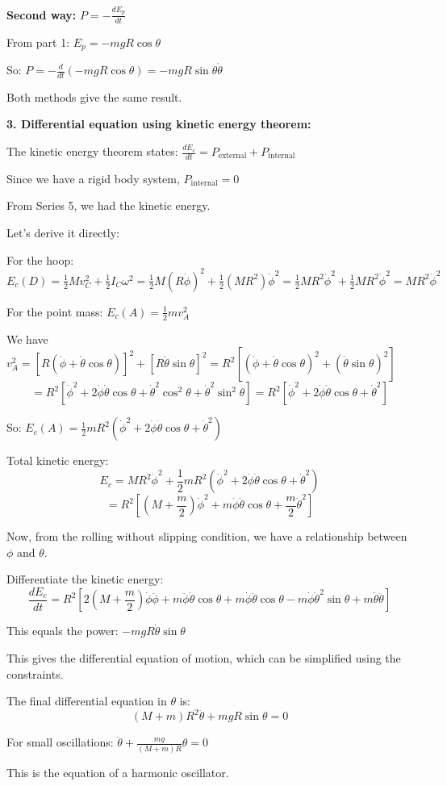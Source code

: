 \documentclass[12pt]{article}
\begin{document}
\begin{correctionbox}
\textbf{Second way:} $P = -\frac{dE_p}{dt}$

From part 1: $E_p = -mgR\cos\theta$

So: $P = -\frac{d}{dt}(-mgR\cos\theta) = -mgR\sin\theta\dot{\theta}$

Both methods give the same result.

\textbf{3. Differential equation using kinetic energy theorem:}

The kinetic energy theorem states: $\frac{dE_c}{dt} = P_{\text{external}} + P_{\text{internal}}$

Since we have a rigid body system, $P_{\text{internal}} = 0$

From Series 5, we had the kinetic energy.

Let's derive it directly:

For the hoop: $E_c(D) = \frac{1}{2}Mv_C^2 + \frac{1}{2}I_C\omega^2 = \frac{1}{2}M(R\dot{\phi})^2 + \frac{1}{2}(MR^2)\dot{\phi}^2 = \frac{1}{2}MR^2\dot{\phi}^2 + \frac{1}{2}MR^2\dot{\phi}^2 = MR^2\dot{\phi}^2$

For the point mass: $E_c(A) = \frac{1}{2}mv_A^2$

We have $v_A^2 = [R(\dot{\phi} + \dot{\theta}\cos\theta)]^2 + [R\dot{\theta}\sin\theta]^2 = R^2[(\dot{\phi} + \dot{\theta}\cos\theta)^2 + (\dot{\theta}\sin\theta)^2]$
$$= R^2[\dot{\phi}^2 + 2\dot{\phi}\dot{\theta}\cos\theta + \dot{\theta}^2\cos^2\theta + \dot{\theta}^2\sin^2\theta] = R^2[\dot{\phi}^2 + 2\dot{\phi}\dot{\theta}\cos\theta + \dot{\theta}^2]$$

So: $E_c(A) = \frac{1}{2}mR^2(\dot{\phi}^2 + 2\dot{\phi}\dot{\theta}\cos\theta + \dot{\theta}^2)$

Total kinetic energy:
$$E_c = MR^2\dot{\phi}^2 + \frac{1}{2}mR^2(\dot{\phi}^2 + 2\dot{\phi}\dot{\theta}\cos\theta + \dot{\theta}^2)$$
$$= R^2\left[(M + \frac{m}{2})\dot{\phi}^2 + m\dot{\phi}\dot{\theta}\cos\theta + \frac{m}{2}\dot{\theta}^2\right]$$

Now, from the rolling without slipping condition, we have a relationship between $\phi$ and $\theta$.

Differentiate the kinetic energy:
$$\frac{dE_c}{dt} = R^2\left[2(M + \frac{m}{2})\dot{\phi}\ddot{\phi} + m\ddot{\phi}\dot{\theta}\cos\theta + m\dot{\phi}\ddot{\theta}\cos\theta - m\dot{\phi}\dot{\theta}^2\sin\theta + m\dot{\theta}\ddot{\theta}\right]$$

This equals the power: $-mgR\dot{\theta}\sin\theta$

This gives the differential equation of motion, which can be simplified using the constraints.

The final differential equation in $\theta$ is:
$$(M + m)R^2\ddot{\theta} + mgR\sin\theta = 0$$

For small oscillations: $\ddot{\theta} + \frac{mg}{(M + m)R}\theta = 0$

This is the equation of a harmonic oscillator.
\end{correctionbox}
\end{document}
